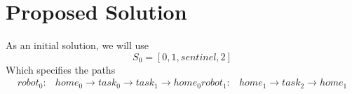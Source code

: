 \documentclass[a4paper]{article}
\begin{document}

\section{Proposed Solution}

As an initial solution, we will use
$$S_0 = [0, 1, \mathit{sentinel}, 2 ]$$
Which specifies the paths
\begin{align*}
\mathit{robot}_0: & \mathit{home}_0 \rightarrow \mathit{task}_0 \rightarrow \mathit{task}_1 \rightarrow  \mathit{home}_0
\mathit{robot}_1: & \mathit{home}_1 \rightarrow \mathit{task}_2 \rightarrow \mathit{home}_1
\end{align*}







\end{document}
